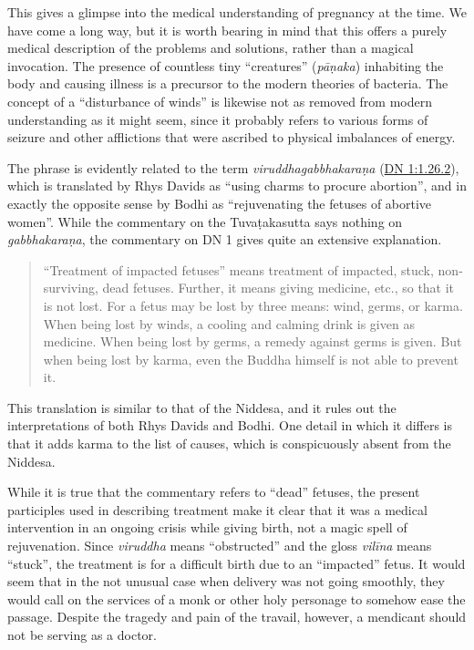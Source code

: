 \documentclass[12pt,openany]{book}%
\begin{document}
This gives a glimpse into the medical understanding of pregnancy at the time. We have come a long way, but it is worth bearing in mind that this offers a purely medical description of the problems and solutions, rather than a magical invocation. The presence of countless tiny “creatures” (\textit{\textsanskrit{pāṇaka}}) inhabiting the body and causing illness is a precursor to the modern theories of bacteria. The concept of a “disturbance of winds” is likewise not as removed from modern understanding as it might seem, since it probably refers to various forms of seizure and other afflictions that were ascribed to physical imbalances of energy.

The phrase is evidently related to the term \textit{\textsanskrit{viruddhagabbhakaraṇa}} (\href{https://suttacentral.net/dn1/en/sujato\#1.26.2}{DN 1:1.26.2}), which is translated by Rhys Davids as “using charms to procure abortion”, and in exactly the opposite sense by Bodhi as “rejuvenating the fetuses of abortive women”. While the commentary on the \textsanskrit{Tuvaṭakasutta} says nothing on \textit{\textsanskrit{gabbhakaraṇa}}, the commentary on DN 1 gives quite an extensive explanation.

\begin{quotation}%
“Treatment of impacted fetuses” means treatment of impacted, stuck, non-surviving, dead fetuses. Further, it means giving medicine, etc., so that it is not lost. For a fetus may be lost by three means: wind, germs, or karma. When being lost by winds, a cooling and calming drink is given as medicine. When being lost by germs, a remedy against germs is given. But when being lost by karma, even the Buddha himself is not able to prevent it.

%
\end{quotation}

This translation is similar to that of the Niddesa, and it rules out the interpretations of both Rhys Davids and Bodhi. One detail in which it differs is that it adds karma to the list of causes, which is conspicuously absent from the Niddesa.

While it is true that the commentary refers to “dead” fetuses, the present participles used in describing treatment make it clear that it was a medical intervention in an ongoing crisis while giving birth, not a magic spell of rejuvenation. Since \textit{viruddha} means “obstructed” and the gloss \textit{\textsanskrit{vilīna}} means “stuck”, the treatment is for a difficult birth due to an “impacted” fetus. It would seem that in the not unusual case when delivery was not going smoothly, they would call on the services of a monk or other holy personage to somehow ease the passage. Despite the tragedy and pain of the travail, however, a mendicant should not be serving as a doctor.
\end{document}

